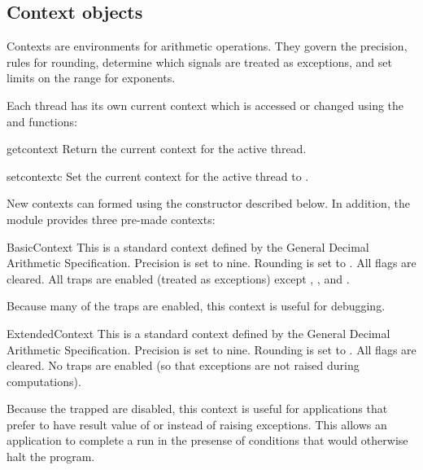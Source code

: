     
\subsection{Context objects \label{decimal-decimal}}

Contexts are environments for arithmetic operations.  They govern the precision,
rules for rounding, determine which signals are treated as exceptions, and set limits
on the range for exponents.

Each thread has its own current context which is accessed or changed using
the  and  functions:

\begin{funcdesc}{getcontext}{}
  Return the current context for the active thread.                                          
\end{funcdesc}            

\begin{funcdesc}{setcontext}{c}
  Set the current context for the active thread to .                                          
\end{funcdesc}  

New contexts can formed using the  constructor described below.
In addition, the module provides three pre-made contexts:                                          


\begin{classdesc*}{BasicContext}
  This is a standard context defined by the General Decimal Arithmetic
  Specification.  Precision is set to nine.  Rounding is set to
  .  All flags are cleared.  All traps are enabled
  (treated as exceptions) except , , and
  .

  Because many of the traps are enabled, this context is useful for debugging.
\end{classdesc*}

\begin{classdesc*}{ExtendedContext}
  This is a standard context defined by the General Decimal Arithmetic
  Specification.  Precision is set to nine.  Rounding is set to
  .  All flags are cleared.  No traps are enabled
  (so that exceptions are not raised during computations).

  Because the trapped are disabled, this context is useful for applications
  that prefer to have result value of  or 
  instead of raising exceptions.  This allows an application to complete a
  run in the presense of conditions that would otherwise halt the program.
\end{classdesc*}

